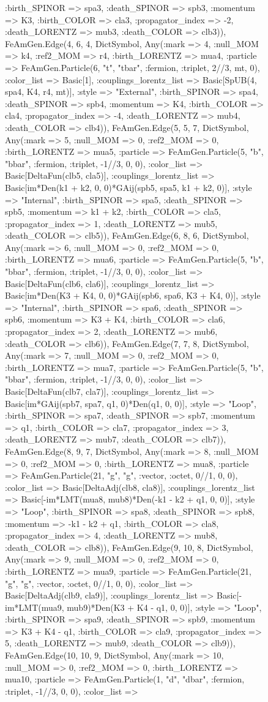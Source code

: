 \documentclass{revtex4}
\begin{document}
\begin{figure}[!htb]
\begin{center}
{:birth_SPINOR => spa3, :death_SPINOR => spb3, :momentum => K3, :birth_COLOR => cla3, :propagator_index => -2, :death_LORENTZ => mub3, :death_COLOR => clb3)), FeAmGen.Edge(4, 6, 4, Dict{Symbol, Any}(:mark => 4, :null_MOM => k4, :ref2_MOM => r4, :birth_LORENTZ => mua4, :particle => FeAmGen.Particle(6, "t", "tbar", :fermion, :triplet, 2//3, mt, 0), :color_list => Basic[1], :couplings_lorentz_list => Basic[SpUB(4, spa4, K4, r4, mt)], :style => "External", :birth_SPINOR => spa4, :death_SPINOR => spb4, :momentum => K4, :birth_COLOR => cla4, :propagator_index => -4, :death_LORENTZ => mub4, :death_COLOR => clb4)), FeAmGen.Edge(5, 5, 7, Dict{Symbol, Any}(:mark => 5, :null_MOM => 0, :ref2_MOM => 0, :birth_LORENTZ => mua5, :particle => FeAmGen.Particle(5, "b", "bbar", :fermion, :triplet, -1//3, 0, 0), :color_list => Basic[DeltaFun(clb5, cla5)], :couplings_lorentz_list => Basic[im*Den(k1 + k2, 0, 0)*GAij(spb5, spa5, k1 + k2, 0)], :style => "Internal", :birth_SPINOR => spa5, :death_SPINOR => spb5, :momentum => k1 + k2, :birth_COLOR => cla5, :propagator_index => 1, :death_LORENTZ => mub5, :death_COLOR => clb5)), FeAmGen.Edge(6, 8, 6, Dict{Symbol, Any}(:mark => 6, :null_MOM => 0, :ref2_MOM => 0, :birth_LORENTZ => mua6, :particle => FeAmGen.Particle(5, "b", "bbar", :fermion, :triplet, -1//3, 0, 0), :color_list => Basic[DeltaFun(clb6, cla6)], :couplings_lorentz_list => Basic[im*Den(K3 + K4, 0, 0)*GAij(spb6, spa6, K3 + K4, 0)], :style => "Internal", :birth_SPINOR => spa6, :death_SPINOR => spb6, :momentum => K3 + K4, :birth_COLOR => cla6, :propagator_index => 2, :death_LORENTZ => mub6, :death_COLOR => clb6)), FeAmGen.Edge(7, 7, 8, Dict{Symbol, Any}(:mark => 7, :null_MOM => 0, :ref2_MOM => 0, :birth_LORENTZ => mua7, :particle => FeAmGen.Particle(5, "b", "bbar", :fermion, :triplet, -1//3, 0, 0), :color_list => Basic[DeltaFun(clb7, cla7)], :couplings_lorentz_list => Basic[im*GAij(spb7, spa7, q1, 0)*Den(q1, 0, 0)], :style => "Loop", :birth_SPINOR => spa7, :death_SPINOR => spb7, :momentum => q1, :birth_COLOR => cla7, :propagator_index => 3, :death_LORENTZ => mub7, :death_COLOR => clb7)), FeAmGen.Edge(8, 9, 7, Dict{Symbol, Any}(:mark => 8, :null_MOM => 0, :ref2_MOM => 0, :birth_LORENTZ => mua8, :particle => FeAmGen.Particle(21, "g", "g", :vector, :octet, 0//1, 0, 0), :color_list => Basic[DeltaAdj(clb8, cla8)], :couplings_lorentz_list => Basic[-im*LMT(mua8, mub8)*Den(-k1 - k2 + q1, 0, 0)], :style => "Loop", :birth_SPINOR => spa8, :death_SPINOR => spb8, :momentum => -k1 - k2 + q1, :birth_COLOR => cla8, :propagator_index => 4, :death_LORENTZ => mub8, :death_COLOR => clb8)), FeAmGen.Edge(9, 10, 8, Dict{Symbol, Any}(:mark => 9, :null_MOM => 0, :ref2_MOM => 0, :birth_LORENTZ => mua9, :particle => FeAmGen.Particle(21, "g", "g", :vector, :octet, 0//1, 0, 0), :color_list => Basic[DeltaAdj(clb9, cla9)], :couplings_lorentz_list => Basic[-im*LMT(mua9, mub9)*Den(K3 + K4 - q1, 0, 0)], :style => "Loop", :birth_SPINOR => spa9, :death_SPINOR => spb9, :momentum => K3 + K4 - q1, :birth_COLOR => cla9, :propagator_index => 5, :death_LORENTZ => mub9, :death_COLOR => clb9)), FeAmGen.Edge(10, 10, 9, Dict{Symbol, Any}(:mark => 10, :null_MOM => 0, :ref2_MOM => 0, :birth_LORENTZ => mua10, :particle => FeAmGen.Particle(1, "d", "dbar", :fermion, :triplet, -1//3, 0, 0), :color_list => }
\end{center}
\end{figure}
\end{document}
